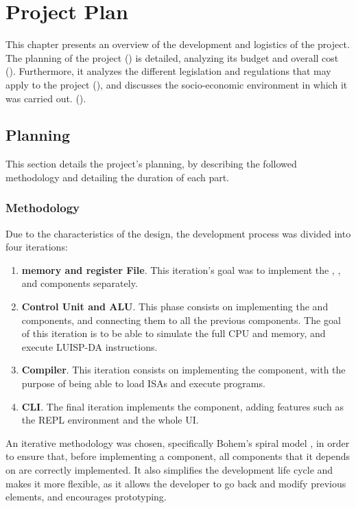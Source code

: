 \chapter{Project Plan}\label{chap:planning}
This chapter presents an overview of the development and logistics of the project. The planning of the project () is detailed, analyzing its budget and overall cost (). Furthermore, it analyzes the different legislation and regulations that may apply to the project (), and discusses the socio-economic environment in which it was carried out. ().


\section{Planning}\label{sec:planning}
This section details the project's planning, by describing the followed methodology and detailing the duration of each part.

\subsection{Methodology}
Due to the characteristics of the design, the development process was divided into four iterations:
\begin{enumerate}[label=\Roman*.]
  \item \textbf{\Gls{memory} and \Gls{register} File}. This iteration's goal was to implement the , , and  components separately.
  \item \textbf{Control Unit and \gls{ALU}}. This phase consists on implementing the  and  components, and connecting them to all the previous components. The goal of this iteration is to be able to simulate the full \gls{CPU} and \gls{memory}, and execute LUISP-DA instructions.
  \item \textbf{Compiler}. This iteration consists on implementing the  component, with the purpose of being able to load \glspl{ISA} and execute programs.
  \item \textbf{\gls{CLI}}. The final iteration implements the  component, adding features such as the \gls{REPL environment} and the whole \gls{UI}.
\end{enumerate}

An iterative methodology was chosen, specifically Bohem's spiral model \parencite{BohemBSpiral}, in order to ensure that, before implementing a component, all components that it depends on are correctly implemented. It also simplifies the development life cycle and makes it more flexible, as it allows the developer to go back and modify previous elements, and encourages prototyping.

